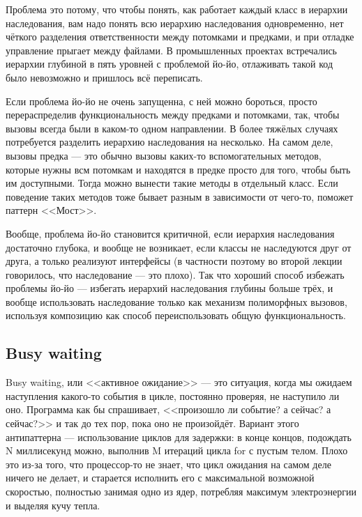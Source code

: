 \documentclass{../../text-style}
\begin{document}
Проблема это потому, что чтобы понять, как работает каждый класс в иерархии наследования, вам надо понять всю иерархию наследования одновременно, нет чёткого разделения ответственности между потомками и предками, и при отладке управление прыгает между файлами. В промышленных проектах встречались иерархии глубиной в пять уровней с проблемой йо-йо, отлаживать такой код было невозможно и пришлось всё переписать.

Если проблема йо-йо не очень запущенна, с ней можно бороться, просто перераспределив функциональность между предками и потомками, так, чтобы вызовы всегда были в каком-то одном направлении. В более тяжёлых случаях потребуется разделить иерархию наследования на несколько. На самом деле, вызовы предка --- это обычно вызовы каких-то вспомогательных методов, которые нужны всм потомкам и находятся в предке просто для того, чтобы быть им доступными. Тогда можно вынести такие методы в отдельный класс. Если поведение таких методов тоже бывает разным в зависимости от чего-то, поможет паттерн <<Мост>>.

Вообще, проблема йо-йо становится критичной, если иерархия наследования достаточно глубока, и вообще не возникает, если классы не наследуются друг от друга, а только реализуют интерфейсы (в частности поэтому во второй лекции говорилось, что наследование --- это плохо). Так что хороший способ избежать проблемы йо-йо --- избегать иерархий наследования глубины больше трёх, и вообще использовать наследование только как механизм полиморфных вызовов, используя композицию как способ переиспользовать общую функциональность.

\subsection{Busy waiting}

Busy waiting, или <<активное ожидание>> --- это ситуация, когда мы ожидаем наступления какого-то события в цикле, постоянно проверяя, не наступило ли оно. Программа как бы спрашивает, <<произошло ли событие? а сейчас? а сейчас?>> и так до тех пор, пока оно не произойдёт. Вариант этого антипаттерна --- использование циклов для задержки: в конце концов, подождать N миллисекунд можно, выполнив M итераций цикла for с пустым телом. Плохо это из-за того, что процессор-то не знает, что цикл ожидания на самом деле ничего не делает, и старается исполнить его с максимальной возможной скоростью, полностью занимая одно из ядер, потребляя максимум электроэнергии и выделяя кучу тепла.
\end{document}
